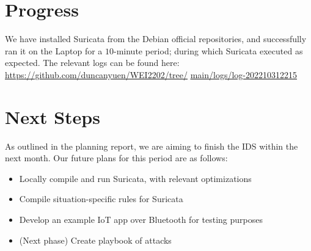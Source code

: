 \documentclass{article}
\begin{document}
\begin{multicols}{2}
\section{Progress}
We have installed Suricata from the Debian official repositories, and successfully ran it on the Laptop for a \(10\)-minute period; during which Suricata executed as expected. The relevant logs can be found here: \href{https://github.com/duncanyuen/WEI2202/tree/main/logs/log-202210312215}{\underline{https://github.com/duncanyuen/WEI2202/tree/}} \href{https://github.com/duncanyuen/WEI2202/tree/main/logs/log-202210312215}{\underline{main/logs/log-202210312215}}
\section{Next Steps}
As outlined in the planning report, we are aiming to finish the IDS within the next month. Our future plans for this period are as follows:
\begin{itemize}
\item[1.]{
Locally compile and run Suricata, with relevant optimizations
}
\item[2.]{
Compile situation-specific rules for Suricata
}
\item[3.]{
Develop an example IoT app over Bluetooth for testing purposes
}
\item[4.]{
(Next phase) Create playbook of attacks
}
\end{itemize}
\end{multicols}



\end{document}
